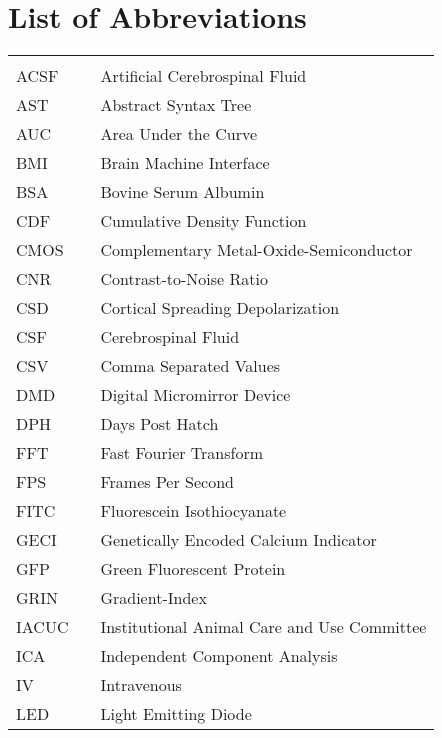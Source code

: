 \chapter*{List of Abbreviations}
\begin{center}
  \begin{tabular}{lll}
    \hspace*{2em} & \hspace*{1in} & \hspace*{4.5in} \\
    ACSF & \dotfill & Artificial Cerebrospinal Fluid \\
    AST  & \dotfill & Abstract Syntax Tree \\
    AUC  & \dotfill & Area Under the Curve \\
    BMI  & \dotfill & Brain Machine Interface \\
    BSA  & \dotfill & Bovine Serum Albumin \\
    CDF  & \dotfill & Cumulative Density Function \\
    CMOS & \dotfill & Complementary Metal-Oxide-Semiconductor \\
    CNR  & \dotfill & Contrast-to-Noise Ratio \\
    CSD  & \dotfill & Cortical Spreading Depolarization \\
    CSF  & \dotfill & Cerebrospinal Fluid \\
    CSV  & \dotfill & Comma Separated Values \\
    DMD  & \dotfill & Digital Micromirror Device \\
    DPH  & \dotfill & Days Post Hatch \\
    FFT  & \dotfill & Fast Fourier Transform \\
    FPS  & \dotfill & Frames Per Second \\
    FITC & \dotfill & Fluorescein Isothiocyanate \\
    GECI & \dotfill & Genetically Encoded Calcium Indicator \\
    GFP  & \dotfill & Green Fluorescent Protein \\
    GRIN & \dotfill & Gradient-Index \\
    IACUC& \dotfill & Institutional Animal Care and Use Committee \\
    ICA  & \dotfill & Independent Component Analysis \\
    IV   & \dotfill & Intravenous \\
    LED  & \dotfill & Light Emitting Diode \\

\end{tabular}
\end{center}
